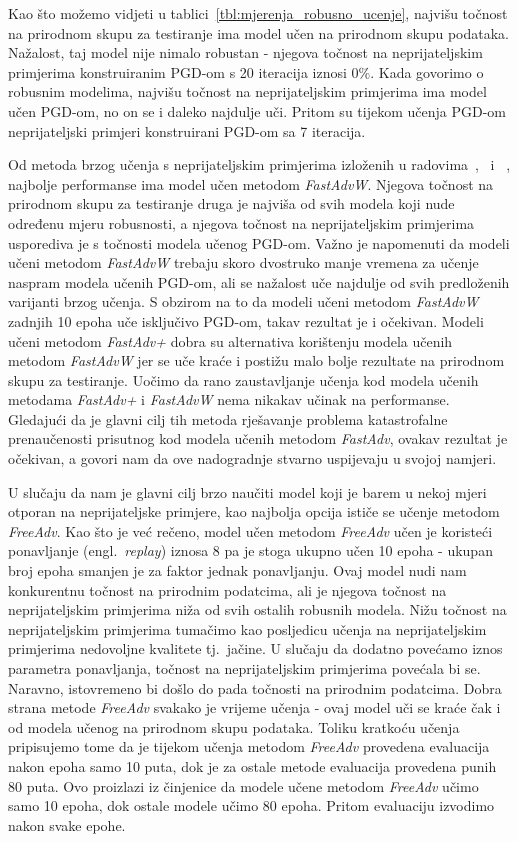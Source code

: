 \documentclass[times, utf8, zavrsni, numeric]{fer}
\begin{document}
Kao što možemo vidjeti u tablici~\ref{tbl:mjerenja_robusno_ucenje}, najvišu točnost na prirodnom skupu za testiranje ima model učen na prirodnom skupu podataka.
Nažalost, taj model nije nimalo robustan - njegova točnost na neprijateljskim primjerima konstruiranim PGD-om s 20 iteracija iznosi $0\%$.
Kada govorimo o robusnim modelima, najvišu točnost na neprijateljskim primjerima ima model učen PGD-om, no on se i daleko najdulje uči.
Pritom su tijekom učenja PGD-om neprijateljski primjeri konstruirani PGD-om sa 7 iteracija.

Od metoda brzog učenja s neprijateljskim primjerima izloženih u radovima~\cite{shafahi2019adversarial},~\cite{wong2020fast} i ~\cite{li2020towards},
najbolje performanse ima model učen metodom \textit{FastAdvW}. Njegova točnost na prirodnom skupu za testiranje druga je najviša od svih modela koji nude određenu mjeru robusnosti,
a njegova točnost na neprijateljskim primjerima usporediva je s točnosti modela učenog PGD-om. 
Važno je napomenuti da modeli učeni metodom \textit{FastAdvW} trebaju skoro dvostruko manje vremena za učenje naspram modela učenih PGD-om, ali se nažalost uče najdulje od svih predloženih varijanti brzog učenja.
S obzirom na to da modeli učeni metodom \textit{FastAdvW} zadnjih 10 epoha uče isključivo PGD-om, takav rezultat je i očekivan.
Modeli učeni metodom \textit{FastAdv+} dobra su alternativa korištenju modela učenih metodom \textit{FastAdvW} jer se uče kraće i postižu malo bolje rezultate na prirodnom skupu za testiranje.
Uočimo da rano zaustavljanje učenja kod modela učenih metodama \textit{FastAdv+} i \textit{FastAdvW} nema nikakav učinak na performanse. 
Gledajući da je glavni cilj tih metoda rješavanje problema katastrofalne prenaučenosti prisutnog kod modela učenih metodom \textit{FastAdv}, ovakav rezultat je očekivan, 
a govori nam da ove nadogradnje stvarno uspijevaju u svojoj namjeri.

U slučaju da nam je glavni cilj brzo naučiti model koji je barem u nekoj mjeri otporan na neprijateljske primjere, kao najbolja opcija ističe se učenje metodom \textit{FreeAdv}.
Kao što je već rečeno, model učen metodom \textit{FreeAdv} učen je koristeći ponavljanje (engl.\ \textit{replay}) iznosa 8 pa je stoga ukupno učen 10 epoha - ukupan broj epoha smanjen je za faktor jednak ponavljanju.
Ovaj model nudi nam konkurentnu točnost na prirodnim podatcima, ali je njegova točnost na neprijateljskim primjerima niža od svih ostalih robusnih modela. 
Nižu točnost na neprijateljskim primjerima tumačimo kao posljedicu učenja na neprijateljskim primjerima nedovoljne kvalitete tj.\ jačine. 
U slučaju da dodatno povećamo iznos parametra ponavljanja, točnost na neprijateljskim primjerima povećala bi se. Naravno, istovremeno bi došlo do pada točnosti na prirodnim podatcima.
Dobra strana metode \textit{FreeAdv} svakako je vrijeme učenja - ovaj model uči se kraće čak i od modela učenog na prirodnom skupu podataka. 
Toliku kratkoću učenja pripisujemo tome da je tijekom učenja metodom \textit{FreeAdv} provedena evaluacija nakon epoha samo 10 puta, dok je za ostale metode evaluacija provedena punih 80 puta.
Ovo proizlazi iz činjenice da modele učene metodom \textit{FreeAdv} učimo samo 10 epoha, dok ostale modele učimo 80 epoha. Pritom evaluaciju izvodimo nakon svake epohe.
\end{document}
